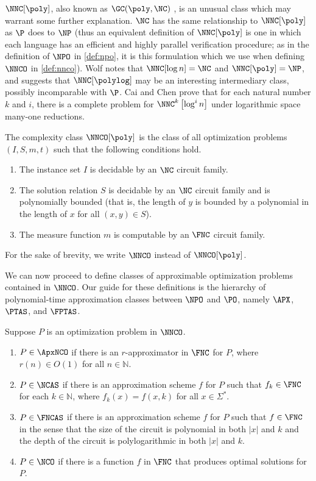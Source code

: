$\NNC[\poly]$, also known as $\GC(\poly, \NC)$ \cite{cc97lim} %
, is an unusual class which may warrant some further explanation.
$\NC$ has the same relationship to $\NNC[\poly]$ as $\P$ does to $\NP$ (thus an equivalent definition of $\NNC[\poly]$ is one in which each language has an efficient and highly parallel verification procedure; as in the definition of $\NPO$ in \autoref{def:npo}, it is this formulation which we use when defining $\NNCO$ in \autoref{def:nnco}).
Wolf \cite{wolf94} notes that $\NNC[\log n]=\NC$ and $\NNC[\poly]=\NP$, and suggests that $\NNC[\polylog]$ may be an interesting intermediary class, possibly incomparable with $\P$.
Cai and Chen \cite{cc97lim} prove that for each natural number $k$ and $i$, there is a complete problem for $\NNC^k\left[\log^i n\right]$ under logarithmic space many-one reductions.

\begin{definition}\label{def:nnco}
  The complexity class $\NNCO[\poly]$ is the class of all optimization problems $(I, S, m, t)$ such that the following conditions hold.
  \begin{enumerate}
  \item The instance set $I$ is decidable by an $\NC$ circuit family.
  \item The solution relation $S$ is decidable by an $\NC$ circuit family and is polynomially bounded (that is, the length of $y$ is bounded by a polynomial in the length of $x$ for all $(x, y)\in S$).
  \item The measure function $m$ is computable by an $\FNC$ circuit family.
  \end{enumerate}
  For the sake of brevity, we write $\NNCO$ instead of $\NNCO[\poly]$.
\end{definition}

We can now proceed to define classes of approximable optimization problems contained in $\NNCO$.
Our guide for these definitions is the hierarchy of polynomial-time approximation classes between $\NPO$ and $\PO$, namely $\APX$, $\PTAS$, and $\FPTAS$.

\begin{definition}\label{def:ncx}
  Suppose $P$ is an optimization problem in $\NNCO$.
  \begin{enumerate}
  \item $P \in \ApxNCO$ if there is an $r$-approximator in $\FNC$ for $P$, where $r(n) \in O(1)$ for all $n \in \mathbb{N}$.
  \item $P \in \NCAS$ if there is an approximation scheme $f$ for $P$ such that $f_k \in \FNC$ for each $k \in \mathbb{N}$, where $f_k(x) = f(x, k)$ for all $x \in \Sigma^*$.
  \item $P \in \FNCAS$ if there is an approximation scheme $f$ for $P$ such that $f \in \FNC$ in the sense that the size of the circuit is polynomial in both $|x|$ and $k$ and the depth of the circuit is polylogarithmic in both $|x|$ and $k$.
  \item $P \in \NCO$ if there is a function $f$ in $\FNC$ that produces optimal solutions for $P$.
  \end{enumerate}
\end{definition}


